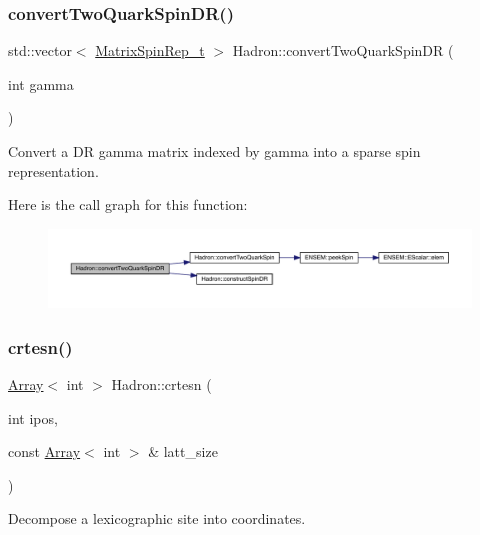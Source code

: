 \subsubsection{\texorpdfstring{convertTwoQuarkSpinDR()}{convertTwoQuarkSpinDR()}}
{\footnotesize\ttfamily std\+::vector$<$ \mbox{\hyperlink{structHadron_1_1MatrixSpinRep__t}{Matrix\+Spin\+Rep\+\_\+t}} $>$ Hadron\+::convert\+Two\+Quark\+Spin\+DR (\begin{DoxyParamCaption}\item[{int}]{gamma }\end{DoxyParamCaption})}



Convert a DR gamma matrix indexed by gamma into a sparse spin representation. 

Here is the call graph for this function\+:\nopagebreak
\begin{figure}[H]
\begin{center}
\leavevmode
\includegraphics[width=350pt]{d1/daf/namespaceHadron_aadefc7d519d40f16cb37c4df644944e7_cgraph}
\end{center}
\end{figure}
\mbox{\label{namespaceHadron_a10fe1c3c465ac8dd8b6edab007aa6ab7}} 
\subsubsection{\texorpdfstring{crtesn()}{crtesn()}}
{\footnotesize\ttfamily \mbox{\hyperlink{classXMLArray_1_1Array}{Array}}$<$ int $>$ Hadron\+::crtesn (\begin{DoxyParamCaption}\item[{int}]{ipos,  }\item[{const \mbox{\hyperlink{classXMLArray_1_1Array}{Array}}$<$ int $>$ \&}]{latt\+\_\+size }\end{DoxyParamCaption})}



Decompose a lexicographic site into coordinates. 

